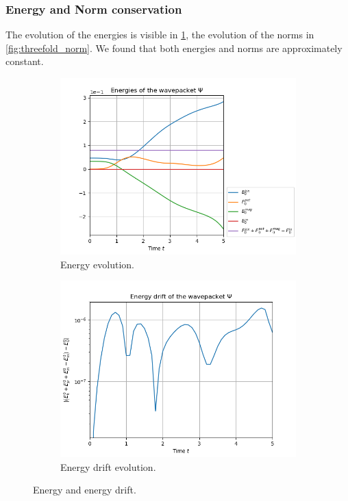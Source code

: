 \documentclass[11pt, a4paper, oneside]{article}
\begin{document}
\subsubsection{Energy and Norm conservation}
The evolution of the energies is visible in \cref{fig:threefold_energy}, the evolution of the norms in \cref{fig:threefold_norm}. We found that both energies and norms are approximately constant.
\begin{figure}[h]
  \begin{subfigure}[b]{0.45 \textwidth}
    \includegraphics[width = \textwidth]{graphics/threefold_morse/threefold_energies_block0.PNG}
    \caption{Energy evolution.}
  \end{subfigure}
  \hfill
  \begin{subfigure}[b]{0.45 \textwidth}
    \includegraphics[width = \textwidth]{graphics/threefold_morse/energy_drift_block0_log.PNG}
    \caption{Energy drift evolution.}
  \end{subfigure}
  \caption{Energy and energy drift.}
  \label{fig:threefold_energy}
\end{figure}
\end{document}
